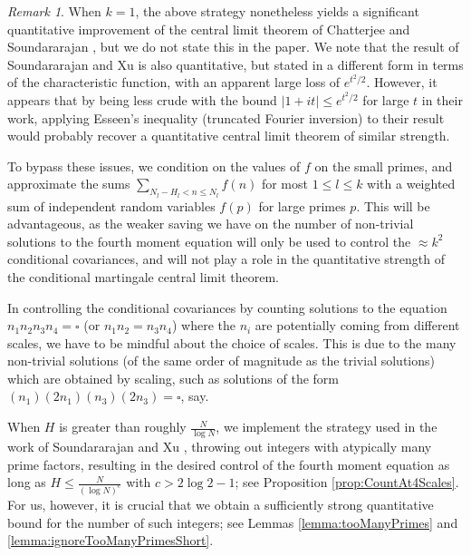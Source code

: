 \documentclass[11pt]{tran-l}
\theoremstyle{definition}
\theoremstyle{remark}
\newtheorem{remark}[theorem]{Remark}
\numberwithin{equation}{section}
\begin{document}
\begin{remark}
    When $k=1$, the above strategy nonetheless yields a significant quantitative improvement of the central limit theorem of Chatterjee and Soundararajan \cite{ChatterjeeSoundararajan2012}, but we do not state this in the paper. We note that the result of Soundararajan and Xu \cite{soundararajan2023clt} is also quantitative, but stated in a different form in terms of the characteristic function, with an apparent large loss of $e^{t^2/2}$. However, it appears that by being less crude with the bound $|1+it|\leq e^{t^2/2}$ for large $t$ in their work, applying Esseen's inequality (truncated Fourier inversion) to their result would probably recover a quantitative central limit theorem of similar strength. 
\end{remark}

To bypass these issues, we condition on the values of $f$ on the small primes, and approximate the sums $\sum_{N_l-H_l<n\leq N_l} f(n)$ for most $1\leq l\leq k$ with a weighted sum of independent random variables $f(p)$ for large primes $p$. This will be advantageous, as the weaker saving we have on the number of non-trivial solutions to the fourth moment equation will only be used to control the $\approx k^2$ conditional covariances, and will not play a role in the quantitative strength of the conditional martingale central limit theorem. 


In controlling the conditional covariances by counting solutions to the equation $n_1n_2n_3n_4 = \square$ (or $n_1n_2=n_3n_4$) where the $n_i$ are potentially coming from different scales, we have to be mindful about the choice of scales. This is due to the many non-trivial solutions (of the same order of magnitude as the trivial solutions) which are obtained by scaling, such as solutions of the form $(n_1)(2n_1)(n_3)(2n_3)=\square$, say. 

When $H$ is greater than roughly $\frac{N}{\log N}$, we implement the strategy used in the work of Soundararajan and Xu \cite{soundararajan2023clt}, throwing out integers with atypically many prime factors, resulting in the desired control of the fourth moment equation as long as $H\leq \frac{N}{(\log N)^c}$ with $c>2\log 2-1$; see Proposition \ref{prop:CountAt4Scales}. For us, however, it is crucial that we obtain a sufficiently strong quantitative bound for the number of such integers; see Lemmas \ref{lemma:tooManyPrimes} and  \ref{lemma:ignoreTooManyPrimesShort}.
\end{document}
